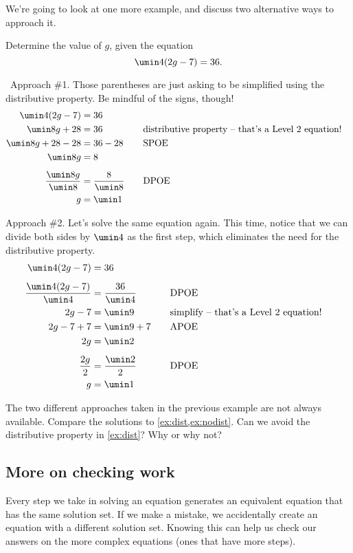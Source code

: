 We're going to look at one more example, and discuss two alternative ways to approach it.

\begin{boxex}
\label{ex:nodist}
Determine the value of $g$, given the equation \[\umin4(2g - 7) = 36.\]

\exsoln\ Approach \#1. Those parentheses are just asking to be simplified using the distributive property. Be mindful of the signs, though!
\[\begin{aligned}
\umin4(2g - 7) &= 36\\
\umin8g + 28 &= 36
&&\text{\quad distributive property -- that's a Level 2 equation!}\\
\umin8g + 28 - 28 &= 36 - 28
&&\text{\quad SPOE}\\
\umin8g &= 8\\[1ex]
\frac{\umin8g}{\umin8} &= \frac{8}{\umin8}
&&\text{\quad DPOE}\\
g &= \umin1
\end{aligned}\]

Approach \#2. Let's solve the same equation again. This time, notice that we can divide both sides by $\umin4$ as the first step, which eliminates the need for the distributive property.
\[\begin{aligned}
\umin4(2g - 7) &= 36\\[1ex]
\frac{\umin4(2g-7)}{\umin4} &= \frac{36}{\umin4}
&&\text{\quad DPOE}\\
2g-7 &= \umin9
&&\text{\quad simplify -- that's a Level 2 equation!}\\
2g-7+7 &= \umin9+7
&&\text{\quad APOE}\\
2g &= \umin2
&&\text{\quad}\\[1ex]
\frac{2g}{2} &= \frac{\umin2}{2}
&&\text{\quad DPOE}\\
g &= \umin1
\end{aligned}\]

\end{boxex}

The two different approaches taken in the previous example are not always available. Compare the solutions to \cref{ex:dist,ex:nodist}. Can we avoid the distributive property in \cref{ex:dist}? Why or why not?


\subsection{More on checking work}

Every step we take in solving an equation generates an equivalent equation that has the same solution set. If we make a mistake, we accidentally create an equation with a different solution set. Knowing this can help us check our answers on the more complex equations (ones that have more steps).

